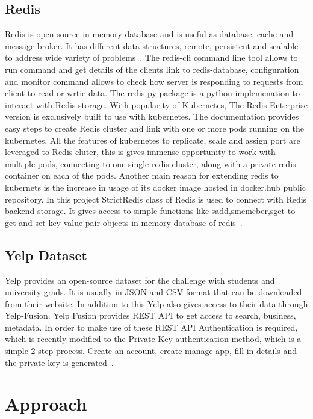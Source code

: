 \subsection{Redis}

Redis is open source in memory database and is useful as database,
cache and message broker. It has different data structures, remote,
persistent and scalable to address wide variety of
problems~\cite{hid-sp18-602-redis}. The redis-cli command line tool
allows to run command and get details of the clients link to
redis-database, configuration and monitor command allows to check how
server is responding to requests from client to read or wrtie
data. The redis-py package is a python implemenation to interact with
Redis storage. With popularity of Kubernetes, The Redis-Enterprise
version is exclusively built to use with kubernetes. The documentation
provides easy steps to create Redis cluster and link with one or more
pods running on the kubernetes. All the features of kubernetes to
replicate, scale and assign port are leveraged to Redis-cluter, this
is gives immense opportunity to work with multiple pods, connecting to
one-single redis cluster, along with a private redis container on each
of the pods. Another main reason for extending redis to kubernets is
the increase in usage of its docker image hosted in docker.hub public
repository. In this project StrictRedis class of Redis is used to
connect with Redis backend storage. It gives access to simple
functions like sadd,smemeber,sget to get and set key-value pair
objects in-memory database of redis~\cite{hid-sp18-602-redis}.

\subsection{Yelp Dataset}

Yelp provides an open-source dataset for the challenge with students
and university grads. It is usually in JSON and CSV format that can be
downloaded from their website. In addition to this Yelp also gives
access to their data through Yelp-Fusion. Yelp Fusion provides REST
API to get access to search, business, metadata. In order to make use
of these REST API Authentication is required, which is recently
modified to the Private Key authentication method, which is a simple 2
step process. Create an account, create manage app, fill in details
and the private key is generated~\cite{hid-sp18-602-yelp}.

\section{Approach}

